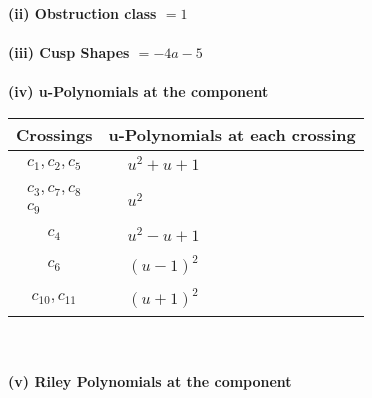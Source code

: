 \documentclass[1p]{elsarticle_modified}
\theoremstyle{definition}
\begin{document}
\flushleft \textbf{(ii) Obstruction class $= 1$}\\~\\
\flushleft \textbf{(iii) Cusp Shapes $= -4 a-5$}\\~\\
\newpage\renewcommand{\arraystretch}{1}
\flushleft \textbf{(iv) u-Polynomials at the component}\newline \\
\begin{tabular}{m{50pt}|m{274pt}}
Crossings & \hspace{64pt}u-Polynomials at each crossing \\
\hline $$\begin{aligned}c_{1},c_{2},c_{5}\end{aligned}$$&$\begin{aligned}
&u^2+u+1
\end{aligned}$\\
\hline $$\begin{aligned}c_{3},c_{7},c_{8}\\c_{9}\end{aligned}$$&$\begin{aligned}
&u^2
\end{aligned}$\\
\hline $$\begin{aligned}c_{4}\end{aligned}$$&$\begin{aligned}
&u^2- u+1
\end{aligned}$\\
\hline $$\begin{aligned}c_{6}\end{aligned}$$&$\begin{aligned}
&(u-1)^2
\end{aligned}$\\
\hline $$\begin{aligned}c_{10},c_{11}\end{aligned}$$&$\begin{aligned}
&(u+1)^2
\end{aligned}$\\
\hline
\end{tabular}\\~\\
\newpage\renewcommand{\arraystretch}{1}
\flushleft \textbf{(v) Riley Polynomials at the component}\newline \\
\end{document}
